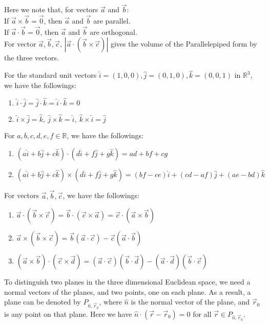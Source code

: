 \documentclass[11pt]{article}
\theoremstyle{break}
\theoremstyle{break}
\newcommand{\R}{\mathbb{R}}
\begin{document}
Here we note that, for vectors $\vec{a}$ and $\vec{b}$:\\
If $\vec{a}\times \vec{b} = \vec{0}$, then $\vec{a}$ and $\vec{b}$ are parallel.\\
If $\vec{a}\cdot \vec{b} = \vec{0}$, then $\vec{a}$ and $\vec{b}$ are orthogonal.\\

For vector $\vec{a},\vec{b},\vec{c}$, $|\vec{a}\cdot (\vec{b}\times \vec{c})|$ gives the volume of the Parallelepiped form by the three vectors.

\newpage


For the standard unit vectors $\hat{i}=(1,0,0),\hat{j}=(0,1,0),\hat{k}=(0,0,1)$ in $\R^3$, we have the followings:
\begin{enumerate}[topsep=3pt,itemsep=-1ex,partopsep=1ex,parsep=1ex]
\item $\hat{i}\cdot \hat{j} = \hat{j}\cdot \hat{k} = \hat{i}\cdot \hat{k} = 0$
\item $\hat{i}\times \hat{j} = \hat{k},\ \hat{j}\times \hat{k} = \hat{ i},\ \hat{k}\times \hat{i} = \hat{j}$
\end{enumerate}
\hfill\break
For $a,b,c,d,e,f \in \R$, we have the followings:
\begin{enumerate}[topsep=3pt,itemsep=-1ex,partopsep=1ex,parsep=1ex]
\item $(a\hat{i}+b\hat{j}+c\hat{k})\cdot (d\hat{i}+f\hat{j}+g\hat{k}) = ad+bf+cg$
\item $(a\hat{i}+b\hat{j}+c\hat{k})\times (d\hat{i}+f\hat{j}+g\hat{k}) = (bf-ce)\hat{i} + (cd-af)\hat{j} + (ae-bd)\hat{k}$
\end{enumerate}
\hfill\break
For vectors $\vec{a},\vec{b},\vec{c}$, we have the followings:
\begin{enumerate}[topsep=3pt,itemsep=-1ex,partopsep=1ex,parsep=1ex]
\item $\vec{a}\cdot (\vec{b}\times \vec{c}) = \vec{b}\cdot (\vec{c}\times \vec{a}) = \vec{c}\cdot (\vec{a}\times \vec{b})$
\item $\vec{a}\times (\vec{b}\times \vec{c}) = \vec{b}(\vec{a}\cdot \vec{c})-\vec{c}(\vec{a}\cdot \vec{b})$
\item $(\vec{a}\times \vec{b})\cdot (\vec{c}\times \vec{d}) = (\vec{a}\cdot \vec{c})(\vec{b}\cdot \vec{d}) - (\vec{a}\cdot \vec{d})(\vec{b}\cdot \vec{c})$
\end{enumerate}
\hfill\break
To distinguish two planes in the three dimensional Euclidean space, we need a normal vectors of the planes, and two points, one on each plane. As a result, a plane can be denoted by $P_{\hat{n},\vec{r}_0}$, where $\hat{n}$ is the normal vector of the plane, and $\vec{r}_0$ is any point on that plane. Here we have $\hat{n}\cdot (\vec{r}-\vec{r}_0) = 0$ for all $\vec{r}\in P_{\hat{n},\vec{r}_0}$.\\
\end{document}
